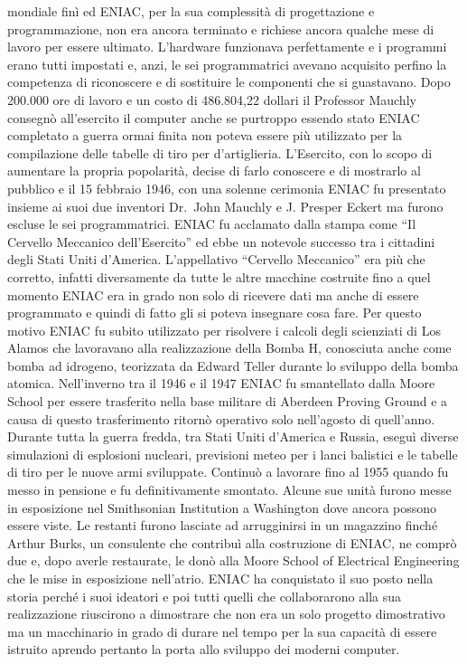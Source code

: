 mondiale finì ed ENIAC, per la sua complessità di progettazione e programmazione, non era ancora terminato e richiese ancora qualche mese di lavoro per essere ultimato. L’hardware funzionava perfettamente e i programmi erano tutti impostati e, anzi, le sei programmatrici avevano acquisito perfino la competenza di riconoscere e di sostituire le componenti che si guastavano. Dopo 200.000 ore di lavoro e un costo di 486.804,22 dollari il Professor Mauchly consegnò all’esercito il computer anche se purtroppo essendo stato ENIAC completato a guerra ormai finita non poteva essere più utilizzato per la compilazione delle tabelle di tiro per d’artiglieria. L’Esercito, con lo scopo di aumentare la propria popolarità, decise di farlo conoscere e di mostrarlo al pubblico e il 15 febbraio 1946, con una solenne cerimonia ENIAC fu presentato insieme ai suoi due inventori Dr.\ John Mauchly e J. Presper Eckert ma furono escluse le sei programmatrici. ENIAC fu acclamato dalla stampa come “Il Cervello Meccanico dell’Esercito” ed ebbe un notevole successo tra i cittadini degli Stati Uniti d’America. L’appellativo “Cervello Meccanico” era più che corretto, infatti diversamente da tutte le altre macchine costruite fino a quel momento ENIAC era in grado non solo di ricevere dati ma anche di essere programmato e quindi di fatto gli si poteva insegnare cosa fare. Per questo motivo ENIAC fu subito utilizzato per risolvere i calcoli degli scienziati di Los Alamos che lavoravano alla realizzazione della Bomba H, conosciuta anche come bomba ad idrogeno, teorizzata da Edward Teller durante lo sviluppo della bomba atomica. Nell’inverno tra il 1946 e il 1947 ENIAC fu smantellato dalla Moore School per essere trasferito nella base militare di Aberdeen Proving Ground e a causa di questo trasferimento ritornò operativo solo nell’agosto di quell’anno. Durante tutta la guerra fredda, tra Stati Uniti d’America e Russia, eseguì diverse simulazioni di esplosioni nucleari, previsioni meteo per i lanci balistici e le tabelle di tiro per le nuove armi sviluppate. Continuò a lavorare fino al 1955 quando fu messo in pensione e fu definitivamente smontato. Alcune sue unità furono messe in esposizione nel Smithsonian Institution a Washington dove ancora possono essere viste. Le restanti furono lasciate ad arrugginirsi in un magazzino finché Arthur Burks, un consulente che contribuì alla costruzione di ENIAC, ne comprò due e, dopo averle restaurate, le donò alla Moore School of Electrical Engineering che le mise in esposizione nell’atrio. ENIAC ha conquistato il suo posto nella storia perché i suoi ideatori e poi tutti quelli che collaborarono alla sua realizzazione riuscirono a dimostrare che non era un solo progetto dimostrativo ma un macchinario in grado di durare nel tempo per la sua capacità di essere istruito aprendo pertanto la porta allo sviluppo dei moderni computer.